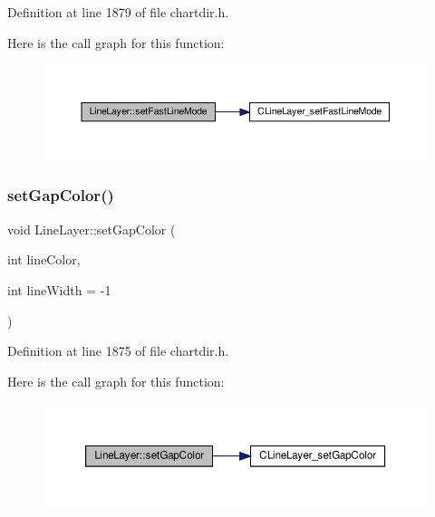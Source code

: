 Definition at line 1879 of file chartdir.\+h.

Here is the call graph for this function\+:
\nopagebreak
\begin{figure}[H]
\begin{center}
\leavevmode
\includegraphics[width=350pt]{class_line_layer_a8554fc14eee73c52ad9bc0ecfe753531_cgraph}
\end{center}
\end{figure}
\mbox{\label{class_line_layer_afe09d8e4799b6428811db89d08ee456b}} 
\subsubsection{\texorpdfstring{set\+Gap\+Color()}{setGapColor()}}
{\footnotesize\ttfamily void Line\+Layer\+::set\+Gap\+Color (\begin{DoxyParamCaption}\item[{int}]{line\+Color,  }\item[{int}]{line\+Width = {\ttfamily -\/1} }\end{DoxyParamCaption})\hspace{0.3cm}{\ttfamily [inline]}}



Definition at line 1875 of file chartdir.\+h.

Here is the call graph for this function\+:
\nopagebreak
\begin{figure}[H]
\begin{center}
\leavevmode
\includegraphics[width=350pt]{class_line_layer_afe09d8e4799b6428811db89d08ee456b_cgraph}
\end{center}
\end{figure}
\mbox{\label{class_line_layer_a64657daacc236f5f74b9f91edf70a6bd}} 
